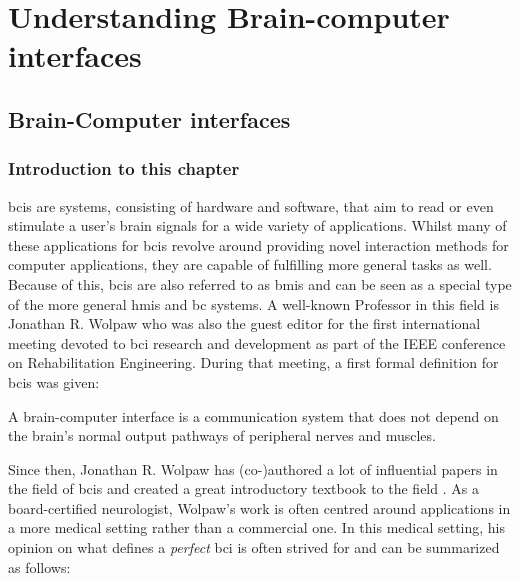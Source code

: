 
\part{Understanding Brain-computer interfaces}


\glsresetall

\chapter{Brain-Computer interfaces}
\label{ch:bci}

\section{Introduction to this chapter}
\label{sec:bci_introduction}

\Glspl{bci} are systems, consisting of hardware and software, that aim to read or even stimulate a user's brain signals for a wide variety of applications.
Whilst many of these applications for \glspl{bci} revolve around providing novel interaction methods for computer applications, they are capable of fulfilling more general tasks as well.
Because of this, \glspl{bci} are also referred to as \glspl{bmi} and can be seen as a special type of the more general \glspl{hmi} and \gls{bc} systems.
A well-known Professor in this field is Jonathan R. Wolpaw who was also the guest editor for the first international meeting devoted to \gls{bci} research and development as part of the IEEE conference on Rehabilitation Engineering.
During that meeting, a first formal definition for \glspl{bci} was given:

\setlength{\epigraphwidth}{0.9\textwidth}
\epigraph{A brain-computer interface is a communication system that does not depend on the brain’s normal output pathways of peripheral nerves and muscles.}{\textit{\citet{first_bci_meeting}}}

Since then, Jonathan R. Wolpaw has (co-)authored a lot of influential papers in the field of \glspl{bci} \citep{bci_rehabilitation, bci_in_medicine, first_bci_meeting} and created a great introductory textbook to the field \citep{bci_book}.
As a board-certified neurologist, Wolpaw's work is often centred around applications in a more medical setting rather than a commercial one. In this medical setting, his opinion on what defines a \textit{perfect} \gls{bci} is often strived for and can be summarized as follows:

